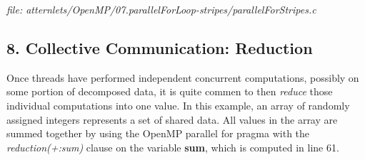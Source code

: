 \documentclass[letterpaper,10pt,openany,oneside]{sphinxmanual}
\begin{document}
\emph{file: atternlets/OpenMP/07.parallelForLoop-stripes/parallelForStripes.c}


\subsection{8. Collective Communication: Reduction}
\label{SharedMemory/OpenMP_Patternlets:collective-communication-reduction}
Once threads have performed independent concurrent computations, possibly
on some portion of decomposed data, it is quite commen to then \emph{reduce}
those individual computations into one value. In this example, an array of randomly assigned integers represents a set of shared data. All values
in the array are summed together by using the OpenMP
parallel for pragma with the \emph{reduction(+:sum)} clause on the variable \textbf{sum},
which is computed in line 61.
\end{document}
